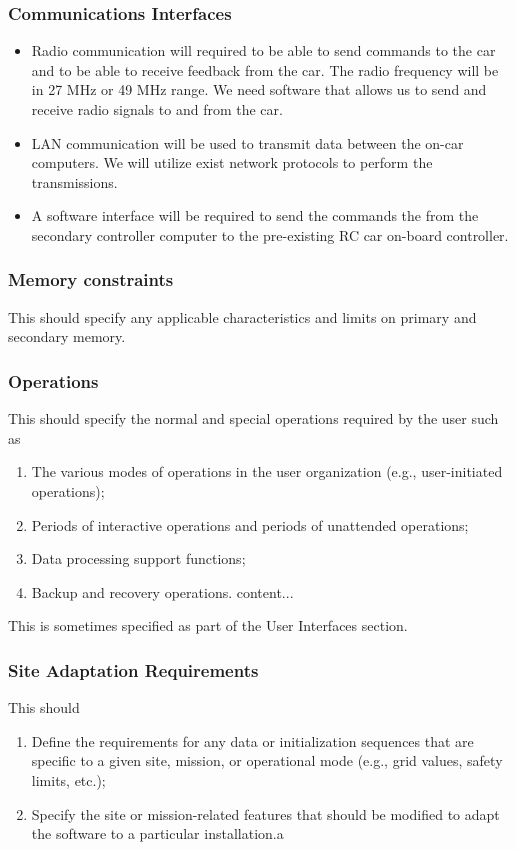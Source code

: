 \documentclass[draftclsnofoot,onecolumn,10pt]{IEEEtran}
\begin{document}
\subsubsection{Communications Interfaces} %
\begin{itemize}
	\item Radio communication will required to be able to send commands to the car and
	to be able to receive feedback from the car. The radio frequency will be in 27
	MHz or 49 MHz range. We need software that allows us to send and receive radio
	signals to and from the car. 
	
	\item LAN communication will be used to transmit data between the on-car computers.
	We will utilize exist network protocols to perform the transmissions.
	
	\item A software interface will be required to send the commands the from the
	secondary controller computer to the pre-existing RC car on-board controller.
	
\end{itemize}


\subsubsection{Memory constraints}
This should specify any applicable characteristics and limits on primary and
secondary memory.

\subsubsection{Operations}
This should specify the normal and special operations required by the user such as
\begin{enumerate}
	\item The various modes of operations in the user organization (e.g.,
		user-initiated operations);
	\item Periods of interactive operations and periods of unattended operations;
	\item Data processing support functions;
	\item Backup and recovery operations.	content...
\end{enumerate}

This is sometimes specified as part of the User Interfaces section.

\subsubsection{Site Adaptation Requirements}
This should
\begin{enumerate}
	\item Define the requirements for any data or initialization sequences that
		are specific to a given site, mission, or operational mode (e.g., grid
		values, safety limits, etc.);
	\item Specify the site or mission-related features that should be modified
		to adapt the software to a particular installation.a
\end{enumerate}
\end{document}

